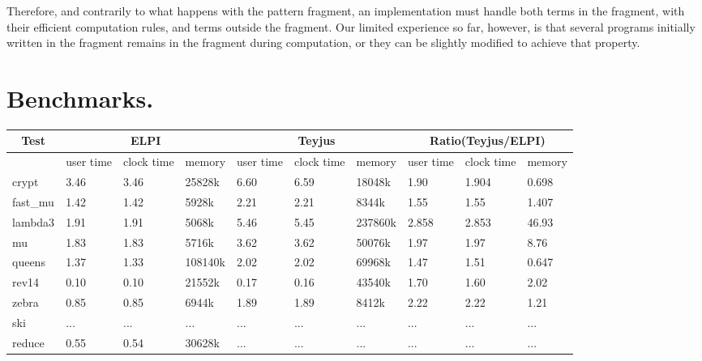 \documentclass{llncs}
\begin{document}
Therefore, and contrarily to what happens with the pattern fragment, an
implementation must handle both terms in the fragment, with their efficient
computation rules, and terms outside the fragment. Our limited experience so
far, however, is that several programs initially written in the fragment
remains in the fragment during computation, or they can be slightly modified
to achieve that property.

\section{Benchmarks.}\label{sec:benchmarks}





\begin{center}

 \begin{table}
  \begin{tabular}{|p{1.2cm}||p{1.1cm}|p{1.1cm}|p{1.3cm}||p{1.1cm}|p{1.1cm}|p{1.3cm}||p{1.1cm}|p{1.1cm}|p{1.3cm}|}
    \hline
      \multicolumn{1}{|c||}{Test} &
      \multicolumn{3}{|c||}{ELPI} &
      \multicolumn{3}{|c||}{Teyjus} &
      \multicolumn{3}{|c|}{Ratio(Teyjus/ELPI)} \\
    \hline
      & user time & clock time & memory & user time & clock time & memory & user time & clock time & memory \\
    \hline
    crypt & 3.46 & 3.46 & 25828k & 6.60 & 6.59 & 18048k & 1.90 & 1.904 & 0.698 \\
    \hline
    fast\_mu & 1.42 & 1.42 & 5928k & 2.21 & 2.21 & 8344k & 1.55 & 1.55 & 1.407 \\
    \hline
    lambda3 & 1.91 & 1.91 & 5068k & 5.46 & 5.45 & 237860k & 2.858 & 2.853 & 46.93 \\
    \hline
    mu & 1.83 & 1.83 & 5716k & 3.62 & 3.62 & 50076k & 1.97 & 1.97 & 8.76 \\
    \hline
    queens & 1.37 & 1.33  & 108140k & 2.02 & 2.02 & 69968k & 1.47 & 1.51 & 0.647 \\
    \hline
    rev14 & 0.10 & 0.10 & 21552k & 0.17 & 0.16 & 43540k & 1.70 & 1.60 & 2.02 \\
    \hline
    zebra & 0.85 & 0.85 & 6944k & 1.89 & 1.89 & 8412k & 2.22 & 2.22 & 1.21 \\
    \hline
    ski & ... & ... & ... & ... & ... & ... & ... & ... & ... \\
    \hline
    reduce & 0.55 & 0.54 & 30628k & ... & ... & ... & ... & ... & ... \\
    \hline
  \end{tabular}
 \end{table}

 \end{center}



 
 


\end{document}
